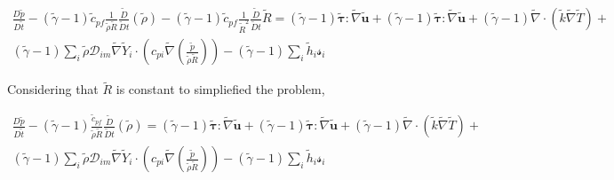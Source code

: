 \documentclass[preprint,12pt,authoryear]{elsarticle}
\begin{document}
\begin{equation}
\begin{split}
        \frac{D \tilde{p}}{D\tilde{t}}
	-
	(\tilde{\gamma}-1)
        \tilde{c}_{pf}
	\frac{1}{\tilde{\rho}\tilde{R}}
        \frac{\tilde{D}}{\tilde{D} t}
	(
	\tilde{\rho}
	)
	-
	(\tilde{\gamma}-1)
        \tilde{c}_{pf}
	\frac{1}{\tilde{R}^2}
        \frac{\tilde{D}}{\tilde{D} t}
	\tilde{R}
        =
	(\tilde{\gamma}-1)
        \pmb{\tilde{\tau}}:\tilde{\nabla} \tilde{\mathbf{u}} 
        + 
	(\tilde{\gamma}-1)
        \pmb{\tilde{\tau}}:\tilde{\nabla} \tilde{\mathbf{u}} 
        + 
	(\tilde{\gamma}-1)
        \tilde{\nabla} \cdot (\tilde{k}\tilde{\nabla} \tilde{T})
        +
	\\
	(\tilde{\gamma}-1)
        \sum\limits_i 
        \tilde{\rho}
        \mathcal{D}_{im}
        \tilde{\nabla}
        \tilde{Y}_i     
        \cdot
        \left(
                c_{pi}
                \tilde{\nabla}
                \left(
                	\frac{\tilde{p}}{\tilde{\rho}\tilde{R}}
                \right)
        \right)
	-
	(\tilde{\gamma}-1)
        \sum\limits_i
        \tilde{h}_i
        \mathcal{s}_i	
\end{split}
\end{equation}


Considering that $\tilde{R}$ is constant to simpliefied the problem,

\begin{equation}
\begin{split}
        \frac{D \tilde{p}}{D\tilde{t}}
	-
	(\tilde{\gamma}-1)
	\frac{\tilde{c}_{pf}}{\tilde{\rho}\tilde{R}}
        \frac{\tilde{D}}{\tilde{D} t}
	(
	\tilde{\rho}
	)
        =
	(\tilde{\gamma}-1)
        \pmb{\tilde{\tau}}:\tilde{\nabla} \tilde{\mathbf{u}} 
        + 
	(\tilde{\gamma}-1)
        \pmb{\tilde{\tau}}:\tilde{\nabla} \tilde{\mathbf{u}} 
        + 
	(\tilde{\gamma}-1)
        \tilde{\nabla} \cdot (\tilde{k}\tilde{\nabla} \tilde{T})
        +
	\\
	(\tilde{\gamma}-1)
        \sum\limits_i 
        \tilde{\rho}
        \mathcal{D}_{im}
        \tilde{\nabla}
        \tilde{Y}_i     
        \cdot
        \left(
                c_{pi}
                \tilde{\nabla}
                \left(
                	\frac{\tilde{p}}{\tilde{\rho}\tilde{R}}
                \right)
        \right)
	-
	(\tilde{\gamma}-1)
        \sum\limits_i
        \tilde{h}_i
        \mathcal{s}_i	
\end{split}
\end{equation}
\end{document}

